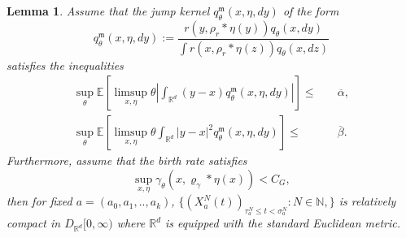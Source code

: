 \documentclass[12pt]{article}
\newtheorem{lemma}[theorem]{Lemma}
\newcommand{\IR}{\mathbb R}
\newcommand{\kernel}{\rho}  %
\newcommand{\smooth}[1]{\kernel_{#1} \! * \!}  %
\begin{document}
\begin{lemma} \label{lem: tightness of individual spatial trajectory}
Assume that the jump kernel $q_\theta^\mathfrak{m}(x, \eta, dy)$ of the form
$$
    q_\theta^\mathfrak{m}(x,\eta,  dy)
    :=
    \frac{
        r(y, \smooth{r} \eta(y)) q_\theta(x, dy)
    }{
        \int r(x, \smooth{r} \eta(z)) q_\theta(x, dz)
    } 
$$
satisfies the inequalities
\begin{align}
   \sup_{\theta}\mathbb{E}\left[\limsup_{x, \eta} \theta \left| \int_{\IR^d} (y-x) q^{\mathfrak{m}}_{ \theta}(x,\eta,dy) \right|\right] \leq & \quad \overline{\alpha},\\
   \sup_{\theta}\mathbb{E}\left[\limsup_{x, \eta} \theta \int_{\IR^d} |y-x|^2 q^{\mathfrak{m}}_{ \theta}(x,\eta,dy)\right]  \leq & \quad \overline{\beta}.
\end{align}
Furthermore, assume that the birth rate satisfies 
$$\sup_{x, \eta}\gamma_{\theta}(x, \varrho_{\gamma}*\eta(x)) < C_G,$$ 
then for fixed $a=(a_0,a_1,..,a_k)$,
$\{(X^{N}_{a}(t))_{\tau^{N}_a\leq t < \sigma^{N}_{a}}: N \in \mathbb{N},  \}$ is relatively compact in 
$D_{\IR^d}[0,\infty )$ where $\IR^d$ is equipped with the standard Euclidean metric. 
\end{lemma}
\end{document}
